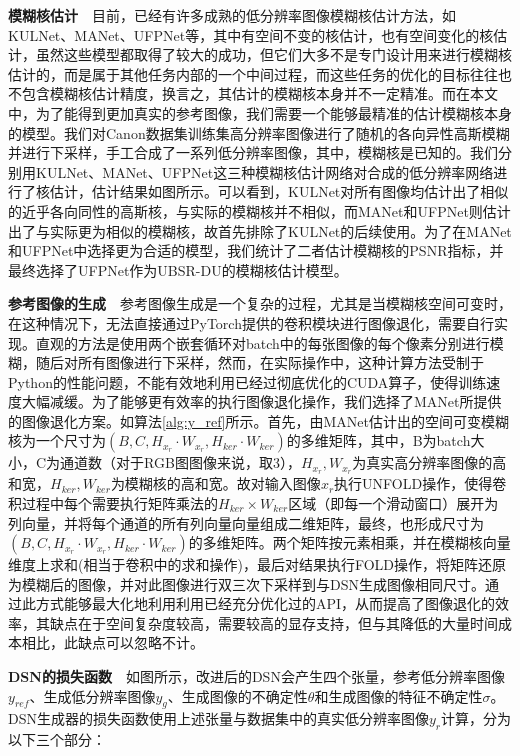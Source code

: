 \noindent\textbf{模糊核估计}\ \ 目前，已经有许多成熟的低分辨率图像模糊核估计方法，如KULNet、MANet、UFPNet等，其中有空间不变的核估计，也有空间变化的核估计，虽然这些模型都取得了较大的成功，但它们大多不是专门设计用来进行模糊核估计的，而是属于其他任务内部的一个中间过程，而这些任务的优化的目标往往也不包含模糊核估计精度，换言之，其估计的模糊核本身并不一定精准。而在本文中，为了能得到更加真实的参考图像，我们需要一个能够最精准的估计模糊核本身的模型。我们对Canon数据集训练集高分辨率图像进行了随机的各向异性高斯模糊并进行下采样，手工合成了一系列低分辨率图像，其中，模糊核是已知的。我们分别用KULNet、MANet、UFPNet这三种模糊核估计网络对合成的低分辨率网络进行了核估计，估计结果如图所示。可以看到，KULNet对所有图像均估计出了相似的近乎各向同性的高斯核，与实际的模糊核并不相似，而MANet和UFPNet则估计出了与实际更为相似的模糊核，故首先排除了KULNet的后续使用。为了在MANet和UFPNet中选择更为合适的模型，我们统计了二者估计模糊核的PSNR指标，并最终选择了UFPNet作为UBSR-DU的模糊核估计模型。

\noindent\textbf{参考图像的生成}\ \ 参考图像生成是一个复杂的过程，尤其是当模糊核空间可变时，在这种情况下，无法直接通过PyTorch提供的卷积模块进行图像退化，需要自行实现。直观的方法是使用两个嵌套循环对batch中的每张图像的每个像素分别进行模糊，随后对所有图像进行下采样，然而，在实际操作中，这种计算方法受制于Python的性能问题，不能有效地利用已经过彻底优化的CUDA算子，使得训练速度大幅减缓。为了能够更有效率的执行图像退化操作，我们选择了MANet所提供的图像退化方案。如算法\ref{alg:y_ref}所示。首先，由MANet估计出的空间可变模糊核为一个尺寸为$(B,C,H_{x_r}\cdot W_{x_r},H_{ker}\cdot W_{ker})$的多维矩阵，其中，B为batch大小，C为通道数（对于RGB图图像来说，取3），$H_{x_r},W_{x_r}$为真实高分辨率图像的高和宽，$H_{ker},W_{ker}$为模糊核的高和宽。故对输入图像$x_r$执行UNFOLD操作，使得卷积过程中每个需要执行矩阵乘法的$H_{ker}\times W_{ker}$区域（即每一个滑动窗口）展开为列向量，并将每个通道的所有列向量向量组成二维矩阵，最终，也形成尺寸为$(B,C,H_{x_r}\cdot W_{x_r},H_{ker}\cdot W_{ker})$的多维矩阵。两个矩阵按元素相乘，并在模糊核向量维度上求和(相当于卷积中的求和操作)，最后对结果执行FOLD操作，将矩阵还原为模糊后的图像，并对此图像进行双三次下采样到与DSN生成图像相同尺寸。通过此方式能够最大化地利用利用已经充分优化过的API，从而提高了图像退化的效率，其缺点在于空间复杂度较高，需要较高的显存支持，但与其降低的大量时间成本相比，此缺点可以忽略不计。

\noindent\textbf{DSN的损失函数}\ \ 如图所示，改进后的DSN会产生四个张量，参考低分辨率图像$y_{ref}$、生成低分辨率图像$y_g$、生成图像的不确定性$\theta$和生成图像的特征不确定性$\sigma$。DSN生成器的损失函数使用上述张量与数据集中的真实低分辨率图像$y_r$计算，分为以下三个部分：


